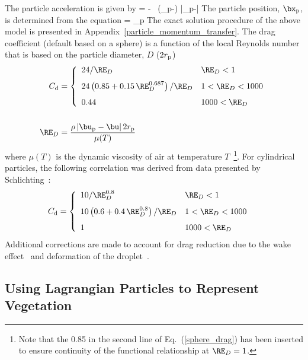 The particle acceleration is given by
\be
     = \bg - \ha {} \,
    (\bu_{\rm p}-\bu) |\bu_{\rm p}-\bu|
\ee
The particle position, $\bx_{\rm p}$, is determined from the equation
\be
     = \bu_{\rm p}
\ee
The exact solution procedure of the above model is presented in Appendix~\ref{particle_momentum_transfer}. The drag coefficient (default based on a sphere) is a function of the local Reynolds number that is based on the particle diameter, $D$ ($2 r_{\rm p}$)
\begin{align}
 C_{\rm d} &= \left\{ \begin{array}{ll}
     24/\RE_D                                          & \RE_D < 1    \\[0.1in]
     24\left(0.85+0.15 \, \RE_D^{0.687} \right)/\RE_D  & 1 < \RE_D < 1000 \label{sphere_drag}\\[0.1in]
     0.44                                              & 1000 < \RE_D
     \end{array} \right.  \\[0.2in]
\RE_D &= \frac{\rho \, |\bu_{\rm p}-\bu| \, 2 r_{\rm p}}{\mu(T)} \end{align}
where $\mu(T)$ is the dynamic viscosity of air at temperature $T$~\cite{Crowe:1}\footnote{Note that the 0.85 in the second line of Eq.~(\ref{sphere_drag}) has been inserted to ensure continuity of the functional relationship at $\RE_D=1$.}. For cylindrical particles, the following correlation was derived from data presented by Schlichting~\cite{Schlichting:1}:
\begin{align}
 C_{\rm d} &= \left\{ \begin{array}{ll}
     10/\RE_D^{0.8}                                & \RE_D < 1    \\[0.1in]
     10\left(0.6+0.4 \, \RE_D^{0.8} \right)/\RE_D  & 1 < \RE_D < 1000 \\[0.1in]
     1                                             & 1000 < \RE_D
     \end{array} \right.
\end{align}
Additional corrections are made to account for drag reduction due to the wake effect~\cite{Ramirez:1} and deformation of the droplet~\cite{Loth:1}.


\subsection{Using Lagrangian Particles to Represent Vegetation}

